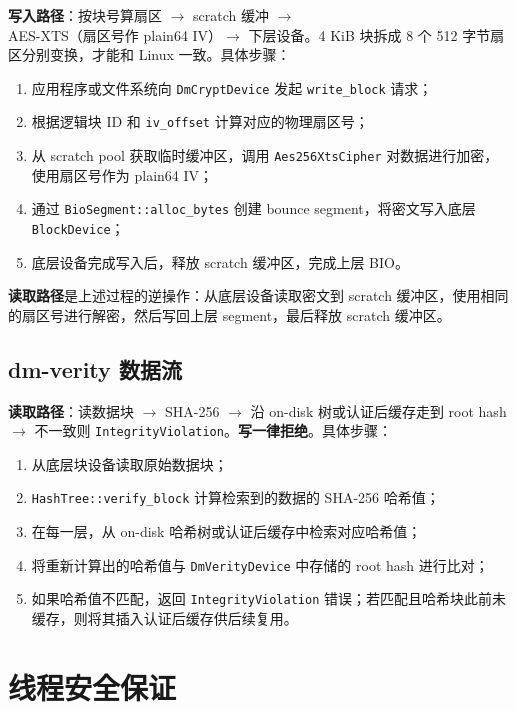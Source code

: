 \textbf{写入路径}：按块号算扇区 $\to$ scratch 缓冲 $\to$ AES-XTS（扇区号作 plain64 IV）$\to$ 下层设备。4 KiB 块拆成 8 个 512 字节扇区分别变换，才能和 Linux 一致。具体步骤：

\begin{enumerate}
    \item 应用程序或文件系统向 \texttt{DmCryptDevice} 发起 \texttt{write\_block} 请求；
    \item 根据逻辑块 ID 和 \texttt{iv\_offset} 计算对应的物理扇区号；
    \item 从 scratch pool 获取临时缓冲区，调用 \texttt{Aes256XtsCipher} 对数据进行加密，使用扇区号作为 plain64 IV；
    \item 通过 \texttt{BioSegment::alloc\_bytes} 创建 bounce segment，将密文写入底层 \texttt{BlockDevice}；
    \item 底层设备完成写入后，释放 scratch 缓冲区，完成上层 BIO。
\end{enumerate}

\textbf{读取路径}是上述过程的逆操作：从底层设备读取密文到 scratch 缓冲区，使用相同的扇区号进行解密，然后写回上层 segment，最后释放 scratch 缓冲区。

\subsection{dm-verity 数据流}

\textbf{读取路径}：读数据块 $\to$ SHA-256 $\to$ 沿 on-disk 树或认证后缓存走到 root hash $\to$ 不一致则 \texttt{IntegrityViolation}。\textbf{写一律拒绝}。具体步骤：

\begin{enumerate}
    \item 从底层块设备读取原始数据块；
    \item \texttt{HashTree::verify\_block} 计算检索到的数据的 SHA-256 哈希值；
    \item 在每一层，从 on-disk 哈希树或认证后缓存中检索对应哈希值；
    \item 将重新计算出的哈希值与 \texttt{DmVerityDevice} 中存储的 root hash 进行比对；
    \item 如果哈希值不匹配，返回 \texttt{IntegrityViolation} 错误；若匹配且哈希块此前未缓存，则将其插入认证后缓存供后续复用。
\end{enumerate}

\section{线程安全保证}

